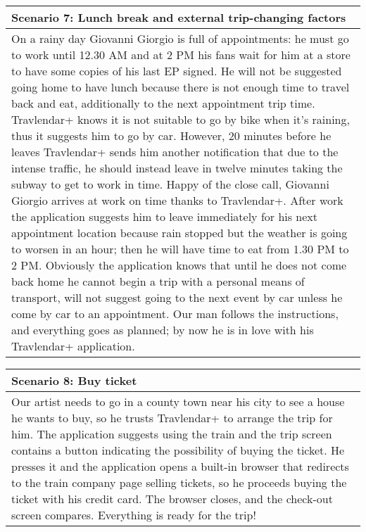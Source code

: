 \pagebreak
%
\begin{center}
\def\arraystretch{1.5}
  \begin{tabular}{ | p{} | }
    \hline
    Scenario 7: Lunch break and external trip-changing factors \\ \hline
    On a rainy day Giovanni Giorgio is full of appointments: he must go to work until 12.30 AM and at 2 PM his fans wait for him at a store to have some copies of his last EP signed. He will not be suggested going home to have lunch because there is not enough time to travel back and eat, additionally to the next appointment trip time. Travlendar+ knows it is not suitable to go by bike when it’s raining, thus it suggests him to go by car. However, 20 minutes before he leaves Travlendar+ sends him another notification that due to the intense traffic, he should instead leave in twelve minutes taking the subway to get to work in time. Happy of the close call, Giovanni Giorgio arrives at work on time thanks to Travlendar+. After work the application suggests him to leave immediately for his next appointment location because rain stopped but the weather is going to worsen in an hour; then he will have time to eat from 1.30 PM to 2 PM. Obviously the application knows that until he does not come back home he cannot begin a trip with a personal means of transport, will not suggest going to the next event by car unless he come by car to an appointment. Our man follows the instructions, and everything goes as planned; by now he is in love with his Travlendar+ application.  \\ \hline
  \end{tabular}
\end{center}
%
\begin{center}
\def\arraystretch{1.5}
  \begin{tabular}{ | p{} | }
    \hline
    Scenario 8: Buy ticket \\ \hline
    Our artist needs to go in a county town near his city to see a house he wants to buy, so he trusts Travlendar+ to arrange the trip for him. The application suggests using the train and the trip screen contains a button indicating the possibility of buying the ticket. He presses it and the application opens a built-in browser that redirects to the train company page selling tickets, so he proceeds buying the ticket with his credit card. The browser closes, and the check-out screen compares. Everything is ready for the trip! \\ \hline
  \end{tabular}
\end{center}
%
